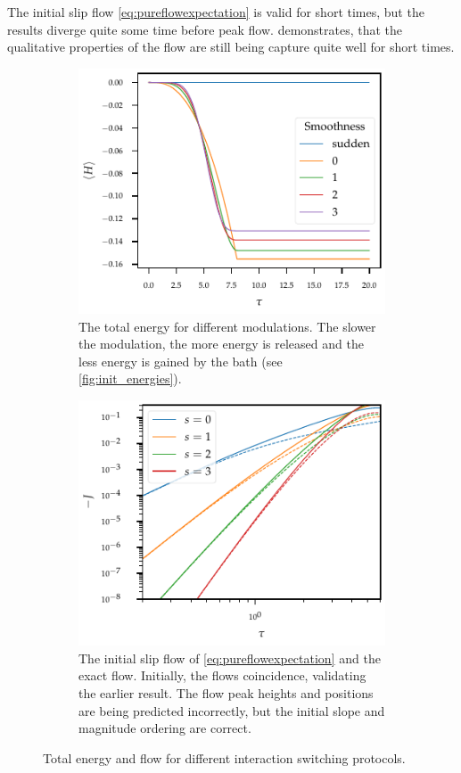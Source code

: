 The initial slip flow \cref{eq:pureflowexpectation} is valid for short
times, but the results diverge quite some time before peak flow.
 demonstrates, that the qualitative properties
of the flow are still being capture quite well for short times.
\begin{figure}[htp]
  \centering
  \begin{subfigure}[t]{0.49\linewidth}
    \centering\captionsetup{width=.8\linewidth}
    \includegraphics{figs/one_bath_mod/total_init}
    \caption{\label{fig:init_total}The total energy for different
      modulations. The slower the modulation, the more energy is
      released and the less energy is gained by the bath (see
      \cref{fig:init_energies}).}
  \end{subfigure}%
  \begin{subfigure}[t]{0.49\linewidth}
    \centering\captionsetup{width=.8\linewidth}
    \includegraphics{figs/one_bath_mod/initial_slip_modcoup}
    \caption{\label{fig:init_slip_mod} The initial slip flow of
      \cref{eq:pureflowexpectation} and the exact flow. Initially, the
      flows coincidence, validating the earlier result. The flow peak
      heights and positions are being predicted incorrectly, but the
      initial slope and magnitude ordering are correct.}
  \end{subfigure}
  \caption{Total energy and flow for different interaction switching
    protocols.}
\end{figure}
